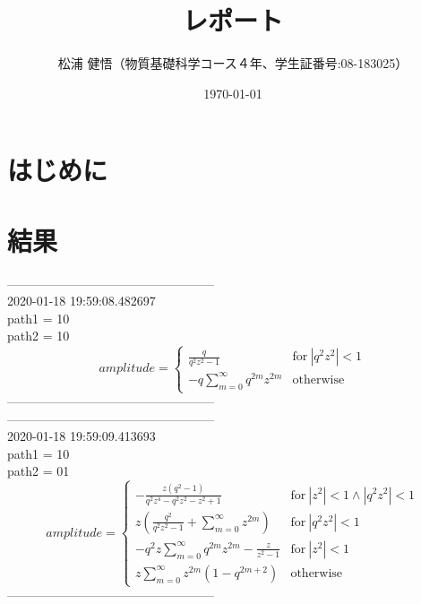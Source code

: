 \documentclass{jsreport}
\begin{document}
\title{レポート}
\author{松浦 健悟（物質基礎科学コース４年、学生証番号:08-183025）}
\date{\today}
\maketitle

\section{はじめに}

\section{}
\section{}

\section{結果}


--------------------------------------------------\\
2020-01-18 19:59:08.482697\\
path1 = 10\\
path2 = 10\\
$$amplitude = \begin{cases} \frac{q}{q^{2} z^{2} - 1} & \text{for}\: \left|{q^{2} z^{2}}\right| < 1 \\- q \sum_{m=0}^{\infty} q^{2 m} z^{2 m} & \text{otherwise} \end{cases}$$
--------------------------------------------------\\
--------------------------------------------------\\
2020-01-18 19:59:09.413693\\
path1 = 10\\
path2 = 01\\
$$amplitude = \begin{cases} - \frac{z \left(q^{2} - 1\right)}{q^{2} z^{4} - q^{2} z^{2} - z^{2} + 1} & \text{for}\: \left|{z^{2}}\right| < 1 \wedge \left|{q^{2} z^{2}}\right| < 1 \\z \left(\frac{q^{2}}{q^{2} z^{2} - 1} + \sum_{m=0}^{\infty} z^{2 m}\right) & \text{for}\: \left|{q^{2} z^{2}}\right| < 1 \\- q^{2} z \sum_{m=0}^{\infty} q^{2 m} z^{2 m} - \frac{z}{z^{2} - 1} & \text{for}\: \left|{z^{2}}\right| < 1 \\z \sum_{m=0}^{\infty} z^{2 m} \left(1 - q^{2 m + 2}\right) & \text{otherwise} \end{cases}$$
--------------------------------------------------\\
\end{document}
